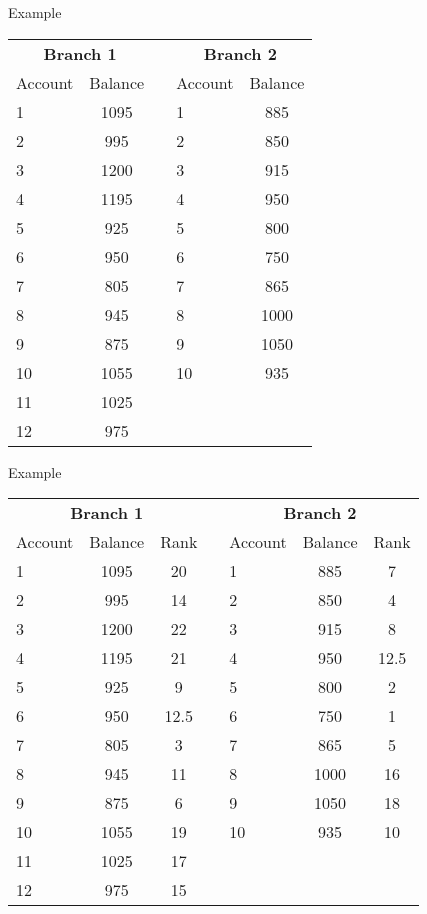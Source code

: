 \begin{frame}{Example}
    \begin{table}[h]
        \centering
        \begin{tabular}{lc c lc}
            \multicolumn{2}{c}{\textbf{Branch 1}} && \multicolumn{2}{c}{\textbf{Branch 2}}  \\
            \cline{1-2} \cline{4-5}
            Account & Balance && Account & Balance \\
            \cline{1-2} \cline{4-5}
            1 & 1095 && 1 & 885 \\
            2 & 995 && 2 & 850 \\
            3 & 1200 && 3 & 915 \\
            4 & 1195 && 4 & 950 \\
            5 & 925 && 5 & 800 \\
            6 & 950 && 6 & 750 \\
            7 & 805 && 7 & 865 \\
            8 & 945 && 8 & 1000 \\
            9 & 875 && 9 & 1050 \\
            10 & 1055 && 10 & 935 \\
            11 & 1025 &&& \\
            12 & 975 &&& \\
        \end{tabular}
    \end{table}
\end{frame}

\begin{frame}{Example}
    \begin{table}[h]
        \centering
        \begin{tabular}{lcc c lcc}
            \multicolumn{3}{c}{\textbf{Branch 1}} && \multicolumn{3}{c}{\textbf{Branch 2}}  \\
            \cline{1-3} \cline{5-7}
            Account & Balance & Rank && Account & Balance & Rank \\
            \cline{1-3} \cline{5-7}
            1 & 1095 & 20 && 1 & 885 & 7 \\
            2 & 995 & 14 && 2 & 850 & 4 \\
            3 & 1200 & 22 && 3 & 915 & 8 \\
            4 & 1195 & 21 && 4 & 950 & 12.5 \\
            5 & 925 & 9 && 5 & 800 & 2 \\
            6 & 950 & 12.5 && 6 & 750 & 1 \\
            7 & 805 & 3 && 7 & 865 & 5 \\
            8 & 945 & 11 && 8 & 1000 & 16 \\
            9 & 875 & 6 && 9 & 1050 & 18 \\
            10 & 1055 & 19 && 10 & 935 & 10 \\
            11 & 1025 & 17 &&& \\
            12 & 975 & 15 &&& \\
        \end{tabular}
    \end{table}
\end{frame}
